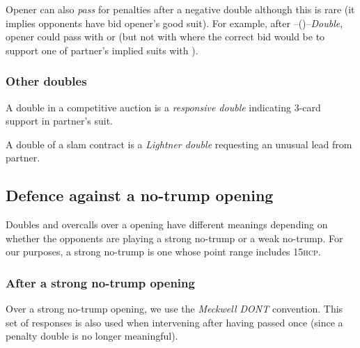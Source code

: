 \documentclass[a4paper,article,oneside]{memoir}
\newcommand{\hcp}{\textsc{hcp}}
\begin{document}
Opener can also \emph{pass} for penalties after a negative double
although this is rare (it implies opponents have bid opener's good
suit). For example, after --()--\emph{Double}, opener
could pass with  or 
(but not with  where the correct bid would be to
support one of partner's implied suits with ).

\subsubsection{Other doubles}

A double in a competitive auction is a \emph{responsive double}
indicating 3-card support in partner's suit.

A double of a slam contract is a \emph{Lightner double} requesting an
unusual lead from partner.

\subsection{Defence against a no-trump opening}

Doubles and overcalls over a  opening have different meanings
depending on whether the opponents are playing a strong no-trump or a
weak no-trump. For our purposes, a strong no-trump is one whose point
range includes 15\hcp.

\subsubsection{After a strong no-trump opening}

Over a strong no-trump opening, we use the \emph{Meckwell DONT}
convention. This set of responses is also used when intervening after
having passed once (since a penalty double is no longer meaningful).
\end{document}
